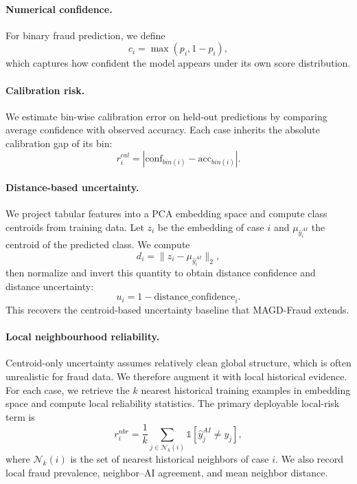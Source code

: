 \paragraph{Numerical confidence.}
For binary fraud prediction, we define
\begin{equation}
c_i = \max(p_i, 1-p_i),
\end{equation}
which captures how confident the model appears under its own score distribution.

\paragraph{Calibration risk.}
We estimate bin-wise calibration error on held-out predictions by comparing average confidence with observed accuracy. Each case inherits the absolute calibration gap of its bin:
\begin{equation}
r^{cal}_i = \left|\text{conf}_{bin(i)} - \text{acc}_{bin(i)}\right|.
\end{equation}

\paragraph{Distance-based uncertainty.}
We project tabular features into a PCA embedding space and compute class centroids from training data. Let $z_i$ be the embedding of case $i$ and $\mu_{\hat{y}^{AI}_i}$ the centroid of the predicted class. We compute
\begin{equation}
d_i = \|z_i - \mu_{\hat{y}^{AI}_i}\|_2,
\end{equation}
then normalize and invert this quantity to obtain distance confidence and distance uncertainty:
\begin{equation}
u_i = 1 - \text{distance\_confidence}_i.
\end{equation}
This recovers the centroid-based uncertainty baseline that MAGD-Fraud extends.

\paragraph{Local neighbourhood reliability.}
Centroid-only uncertainty assumes relatively clean global structure, which is often unrealistic for fraud data. We therefore augment it with local historical evidence. For each case, we retrieve the $k$ nearest historical training examples in embedding space and compute local reliability statistics. The primary deployable local-risk term is
\begin{equation}
r^{nbr}_i = \frac{1}{k}\sum_{j \in \mathcal{N}_k(i)} \mathbb{1}[\hat{y}^{AI}_j \neq y_j],
\end{equation}
where $\mathcal{N}_k(i)$ is the set of nearest historical neighbors of case $i$. We also record local fraud prevalence, neighbor--AI agreement, and mean neighbor distance.

